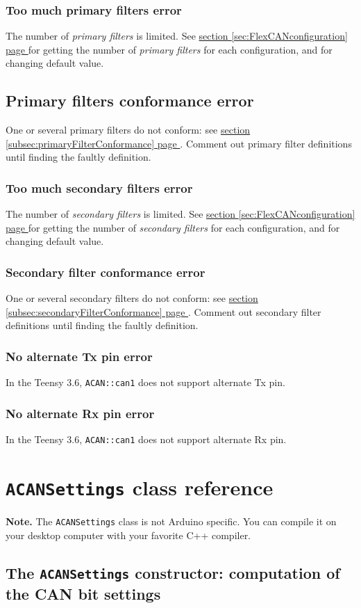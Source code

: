 \documentclass[10pt, a4paper, obeyspaces, openany]{extarticle}
\newcommand \sectionLabel[2]{\section{#1}\label{sec:#2}}
\newcommand\refSectionPage[1]{\hyperref[sec:#1]{section \ref*{sec:#1} page \pageref{sec:#1}}}
\newcommand \subsectionLabel[2]{\subsection{#1}\label{subsec:#2}}
\newcommand\refSubsectionPage[1]{\hyperref[subsec:#1]{section \ref*{subsec:#1} page \pageref{subsec:#1}}}
\newcommand \subsubsectionLabel[2]{\subsubsection{#1}\label{subsubsec:#2}}
\begin{document}
\subsubsectionLabel{Too much primary filters error}{tooMuchPrimaryFiltersError}

The number of \emph{primary filters} is limited. See \refSectionPage{FlexCANconfiguration} for getting the number of \emph{primary filters} for each configuration, and for changing default value.

\subsectionLabel{Primary filters  conformance error}{primaryFilterConformanceError}

One or several primary filters do not conform: see \refSubsectionPage{primaryFilterConformance}. Comment out primary filter definitions until finding the faultly definition.


\subsubsectionLabel{Too much secondary filters error}{tooMuchSecondaryFiltersError}

The number of \emph{secondary filters} is limited. See \refSectionPage{FlexCANconfiguration} for getting the number of \emph{secondary filters} for each configuration, and for changing default value.





\subsubsectionLabel{Secondary filter conformance error}{secondaryFilterConformanceError}

One or several secondary filters do not conform: see \refSubsectionPage{secondaryFilterConformance}. Comment out secondary filter definitions until finding the faultly definition.


\subsubsectionLabel{No alternate Tx pin error}{noAlternateTxPinError}

In the Teensy 3.6, \texttt{ACAN::can1} does not support alternate Tx pin.


\subsubsectionLabel{No alternate Rx pin error}{noAlternateRxPinError}

In the Teensy 3.6, \texttt{ACAN::can1} does not support alternate Rx pin.










\sectionLabel{\texttt{ACANSettings} class reference}{ACanSettingsRef}

{\bf Note. } The \texttt{ACANSettings} class is not Arduino specific. You can compile it on your desktop computer with your favorite C++ compiler. 



\subsectionLabel{The \texttt{ACANSettings} constructor: computation of the CAN bit settings}{CANbitSettings}
\end{document}
